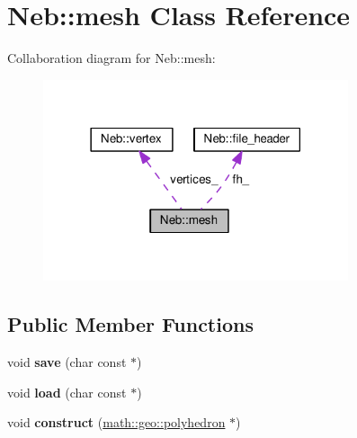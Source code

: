 \hypertarget{classNeb_1_1mesh}{\section{Neb\-:\-:mesh Class Reference}
\label{classNeb_1_1mesh}
}


Collaboration diagram for Neb\-:\-:mesh\-:
\nopagebreak
\begin{figure}[H]
\begin{center}
\leavevmode
\includegraphics[width=254pt]{classNeb_1_1mesh__coll__graph}
\end{center}
\end{figure}
\subsection*{Public Member Functions}
\begin{DoxyCompactItemize}
\item 
\hypertarget{classNeb_1_1mesh_a1cd62a13078f9ee11a30741bdfc97192}{void {\bfseries save} (char const $\ast$)}\label{classNeb_1_1mesh_a1cd62a13078f9ee11a30741bdfc97192}

\item 
\hypertarget{classNeb_1_1mesh_aa0ead851d8c982cdf7c05366a8c3600f}{void {\bfseries load} (char const $\ast$)}\label{classNeb_1_1mesh_aa0ead851d8c982cdf7c05366a8c3600f}

\item 
\hypertarget{classNeb_1_1mesh_a9b05b1c31bc11297c4cbc85800fef4e0}{void {\bfseries construct} (\hyperlink{classmath_1_1geo_1_1polyhedron}{math\-::geo\-::polyhedron} $\ast$)}\label{classNeb_1_1mesh_a9b05b1c31bc11297c4cbc85800fef4e0}

\end{DoxyCompactItemize}
